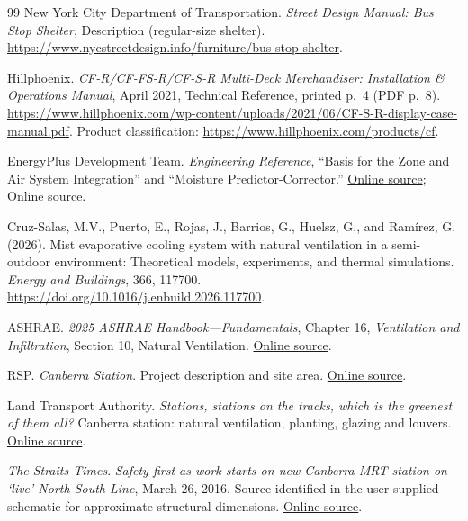 \begin{thebibliography}{99}
New York City Department of Transportation.
\emph{Street Design Manual: Bus Stop Shelter}, Description (regular-size shelter).
\url{https://www.nycstreetdesign.info/furniture/bus-stop-shelter}.


Hillphoenix. \emph{CF-R/CF-FS-R/CF-S-R Multi-Deck Merchandiser: Installation \& Operations Manual}, April 2021, Technical Reference, printed p.~4 (PDF p.~8).
\url{https://www.hillphoenix.com/wp-content/uploads/2021/06/CF-S-R-display-case-manual.pdf}.
Product classification: \url{https://www.hillphoenix.com/products/cf}.


EnergyPlus Development Team. \emph{Engineering Reference},
``Basis for the Zone and Air System Integration'' and ``Moisture Predictor-Corrector.''
\href{https://energyplus.readthedocs.io/en/latest/guides/engineering-reference/2.1-basis-for-the-zone-and-air-system-integration.html}{Online source};
\href{https://energyplus.readthedocs.io/en/latest/guides/engineering-reference/2.4-moisture-predictor-corrector.html}{Online source}.


Cruz-Salas, M.V., Puerto, E., Rojas, J., Barrios, G., Huelsz, G., and Ram\'irez, G. (2026).
Mist evaporative cooling system with natural ventilation in a semi-outdoor environment: Theoretical models, experiments, and thermal simulations.
\emph{Energy and Buildings}, 366, 117700.
\url{https://doi.org/10.1016/j.enbuild.2026.117700}.

ASHRAE. \emph{2025 ASHRAE Handbook---Fundamentals}, Chapter 16,
\emph{Ventilation and Infiltration}, Section 10, Natural Ventilation.
\href{https://handbook.ashrae.org/Handbooks/F25/SI/F25_Ch16/F25_Ch16_si.aspx}{Online source}.


RSP. \emph{Canberra Station}. Project description and site area.
\href{https://rsp.design/project/canberrastation/}{Online source}. 

Land Transport Authority. \emph{Stations, stations on the tracks, which is the greenest of them all?}
Canberra station: natural ventilation, planting, glazing and louvers.
\href{https://www.lta.gov.sg/content/ltagov/en/who_we_are/statistics_and_publications/Connect/greenmrtstations.html}{Online source}.


\emph{The Straits Times}. \emph{Safety first as work starts on new Canberra MRT station on `live' North-South Line}, March 26, 2016.
Source identified in the user-supplied schematic for approximate structural dimensions.
\href{https://www.straitstimes.com/singapore/safety-first-as-work-starts-on-new-canberra-mrt-station-on-live-north-south-line}{Online source}.


\end{thebibliography}
